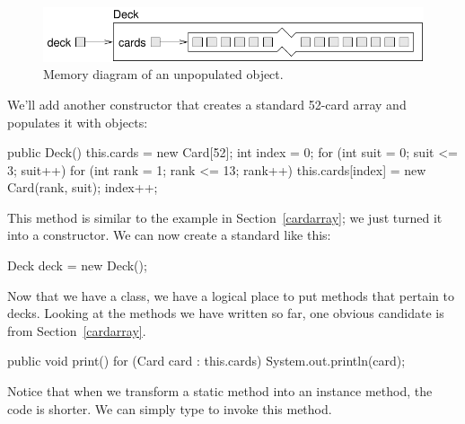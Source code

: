 \begin{figure}[!ht]
\begin{center}
\includegraphics{figs/deckobject.pdf}
\caption{Memory diagram of an unpopulated  object.}
\label{fig.deckobject}
\end{center}
\end{figure}

We'll add another constructor that creates a standard 52-card array and populates it with  objects:

\begin{code}
public Deck() {
    this.cards = new Card[52];
    int index = 0;
    for (int suit = 0; suit <= 3; suit++) {
        for (int rank = 1; rank <= 13; rank++) {
            this.cards[index] = new Card(rank, suit);
            index++;
        }
    }
}
\end{code}

This method is similar to the example in Section~\ref{cardarray}; we just turned it into a constructor.
We can now create a standard  like this:

\begin{code}
Deck deck = new Deck();
\end{code}


Now that we have a  class, we have a logical place to put methods that pertain to decks.
Looking at the methods we have written so far, one obvious candidate is  from Section~\ref{cardarray}.

\begin{code}
public void print() {
    for (Card card : this.cards) {
        System.out.println(card);
    }
}
\end{code}


Notice that when we transform a static method into an instance method, the code is shorter.
We can simply type  to invoke this method.


